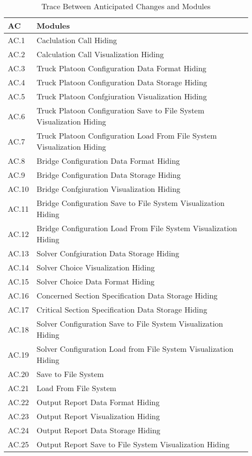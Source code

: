 \documentclass[12pt, titlepage]{article}
\begin{document}
\begin{table}[H]
\centering
\begin{tabular}{p{} p{}}
\toprule
\textbf{AC} & \textbf{Modules}\\
\midrule
AC.1 & Caclulation Call Hiding \\
AC.2 & Calculation Call Visualization Hiding \\
AC.3 & Truck Platoon Configuration Data Format Hiding \\
AC.4 & Truck Platoon Configuration Data Storage Hiding \\
AC.5 & Truck Platoon Confgiuration Visualization Hiding\\
AC.6 & Truck Platoon Configuration Save to File System Visualization Hiding\\
AC.7 & Truck Platoon Configuration Load From File System Visualization Hiding\\
AC.8 & Bridge Configuration Data Format Hiding \\
AC.9 & Bridge Configuration Data Storage Hiding \\
AC.10 & Bridge Confgiuration Visualization Hiding\\
AC.11 & Bridge Configuration Save to File System Visualization Hiding\\
AC.12 & Bridge Configuration Load From File System Visualization Hiding\\
AC.13 & Solver Confgiuration Data Storage Hiding \\
AC.14 & Solver Choice Visualization Hiding \\
AC.15 & Solver Choice Data Format Hiding \\
AC.16 & Concerned Section Specification Data Storage Hiding \\
AC.17 & Critical Section Specification Data Storage Hiding\\
AC.18 & Solver Configuration Save to File System Visualization Hiding\\
AC.19 & Solver Configuration Load from File System Visualization Hiding\\
AC.20 & Save to File System\\
AC.21 & Load From File System\\
AC.22 & Output Report Data Format Hiding\\
AC.23 & Output Report Visualization Hiding\\
AC.24 & Output Report Data Storage Hiding\\
AC.25 & Output Report Save to File System Visualization Hiding\\

\bottomrule
\end{tabular}
\caption{Trace Between Anticipated Changes and Modules}
\label{TblACT}
\end{table}
\end{document}
